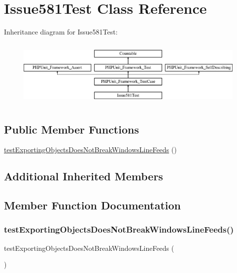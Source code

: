 \hypertarget{class_issue581_test}{}\section{Issue581\+Test Class Reference}
\label{class_issue581_test}
Inheritance diagram for Issue581\+Test\+:\begin{figure}[H]
\begin{center}
\leavevmode
\includegraphics[height=3.303835cm]{class_issue581_test}
\end{center}
\end{figure}
\subsection*{Public Member Functions}
\begin{DoxyCompactItemize}
\item 
\mbox{\hyperlink{class_issue581_test_ad1e1f6286b7a183ac643721ff0f907b6}{test\+Exporting\+Objects\+Does\+Not\+Break\+Windows\+Line\+Feeds}} ()
\end{DoxyCompactItemize}
\subsection*{Additional Inherited Members}


\subsection{Member Function Documentation}
\mbox{\label{class_issue581_test_ad1e1f6286b7a183ac643721ff0f907b6}} 
\subsubsection{\texorpdfstring{test\+Exporting\+Objects\+Does\+Not\+Break\+Windows\+Line\+Feeds()}{testExportingObjectsDoesNotBreakWindowsLineFeeds()}}
{\footnotesize\ttfamily test\+Exporting\+Objects\+Does\+Not\+Break\+Windows\+Line\+Feeds (\begin{DoxyParamCaption}{ }\end{DoxyParamCaption})}



